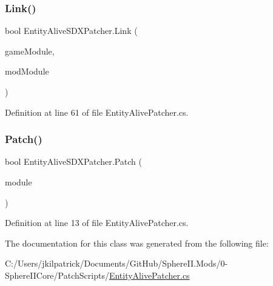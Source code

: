 \subsubsection{\texorpdfstring{Link()}{Link()}}
{\footnotesize\ttfamily bool Entity\+Alive\+S\+D\+X\+Patcher.\+Link (\begin{DoxyParamCaption}\item[{Module\+Definition}]{game\+Module,  }\item[{Module\+Definition}]{mod\+Module }\end{DoxyParamCaption})}



Definition at line 61 of file Entity\+Alive\+Patcher.\+cs.

\mbox{\label{class_entity_alive_s_d_x_patcher_ad788ad16448a2a09ac7e0f4cd7c6030e}} 
\subsubsection{\texorpdfstring{Patch()}{Patch()}}
{\footnotesize\ttfamily bool Entity\+Alive\+S\+D\+X\+Patcher.\+Patch (\begin{DoxyParamCaption}\item[{Module\+Definition}]{module }\end{DoxyParamCaption})}



Definition at line 13 of file Entity\+Alive\+Patcher.\+cs.



The documentation for this class was generated from the following file\+:\begin{DoxyCompactItemize}
\item 
C\+:/\+Users/jkilpatrick/\+Documents/\+Git\+Hub/\+Sphere\+I\+I.\+Mods/0-\/\+Sphere\+I\+I\+Core/\+Patch\+Scripts/\mbox{\hyperlink{_entity_alive_patcher_8cs}{Entity\+Alive\+Patcher.\+cs}}\end{DoxyCompactItemize}
